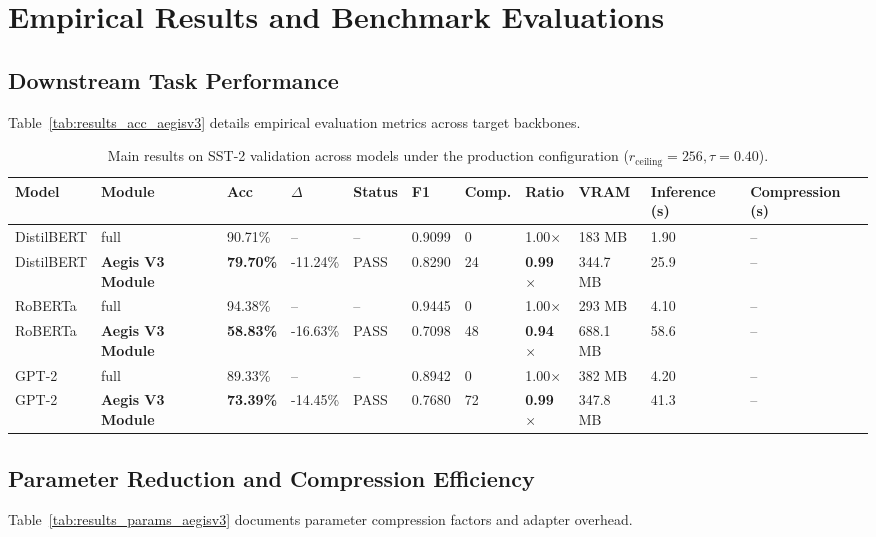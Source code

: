 \section{Empirical Results and Benchmark Evaluations}

\subsection{Downstream Task Performance}
Table~\ref{tab:results_acc_aegisv3} details empirical evaluation metrics across target backbones.

\begin{table}[t]
\centering
\small
\begin{tabular}{lllllllllll}
\toprule
\textbf{Model} & \textbf{Module} & \textbf{Acc} & \textbf{$\Delta$} & \textbf{Status} & \textbf{F1} & \textbf{Comp.} & \textbf{Ratio} & \textbf{VRAM} & \textbf{Inference (s)} & \textbf{Compression (s)} \\
\midrule
DistilBERT & full & 90.71\% & -- & -- & 0.9099 & 0 & 1.00$\times$ & 183 MB & 1.90 & -- \\
DistilBERT & \textbf{Aegis V3 Module} & \textbf{79.70\%} & -11.24\% & PASS & 0.8290 & 24 & \textbf{0.99$\times$} & 344.7 MB & 25.9 & -- \\
RoBERTa & full & 94.38\% & -- & -- & 0.9445 & 0 & 1.00$\times$ & 293 MB & 4.10 & -- \\
RoBERTa & \textbf{Aegis V3 Module} & \textbf{58.83\%} & -16.63\% & PASS & 0.7098 & 48 & \textbf{0.94$\times$} & 688.1 MB & 58.6 & -- \\
GPT-2 & full & 89.33\% & -- & -- & 0.8942 & 0 & 1.00$\times$ & 382 MB & 4.20 & -- \\
GPT-2 & \textbf{Aegis V3 Module} & \textbf{73.39\%} & -14.45\% & PASS & 0.7680 & 72 & \textbf{0.99$\times$} & 347.8 MB & 41.3 & -- \\
\bottomrule
\end{tabular}
\caption{Main results on SST-2 validation across models under the production configuration ($r_{\mathrm{ceiling}}=256, \tau=0.40$).}
\label{tab:main_sst2}
\end{table}

\subsection{Parameter Reduction and Compression Efficiency}
Table~\ref{tab:results_params_aegisv3} documents parameter compression factors and adapter overhead.

